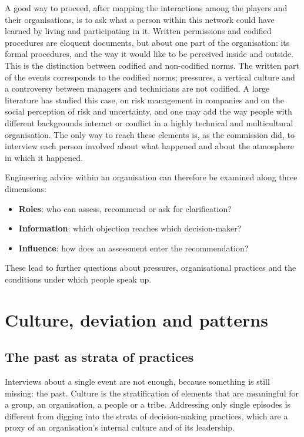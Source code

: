 A good way to proceed, after mapping the interactions among the players and their organisations, is to ask what a person within this network could have learned by living and participating in it. Written permissions and codified procedures are eloquent documents, but about one part of the organisation: its formal procedures, and the way it would like to be perceived inside and outside. This is the distinction between codified and non-codified norms. The written part of the events corresponds to the codified norms; pressures, a vertical culture and a controversy between managers and technicians are not codified. A large literature has studied this case, on risk management in companies and on the social perception of risk and uncertainty, and one may add the way people with different backgrounds interact or conflict in a highly technical and multicultural organisation. The only way to reach these elements is, as the commission did, to interview each person involved about what happened and about the atmosphere in which it happened.

Engineering advice within an organisation can therefore be examined along three dimensions:
\begin{itemize}
	\item \textbf{Roles}: who can assess, recommend or ask for clarification?
	\item \textbf{Information}: which objection reaches which decision-maker?
	\item \textbf{Influence}: how does an assessment enter the recommendation?
\end{itemize}
These lead to further questions about pressures, organisational practices and the conditions under which people speak up.

\section{Culture, deviation and patterns}

\subsection{The past as strata of practices}
Interviews about a single event are not enough, because something is still missing: the past. Culture is the stratification of elements that are meaningful for a group, an organisation, a people or a tribe. Addressing only single episodes is different from digging into the strata of decision-making practices, which are a proxy of an organisation's internal culture and of its leadership.

